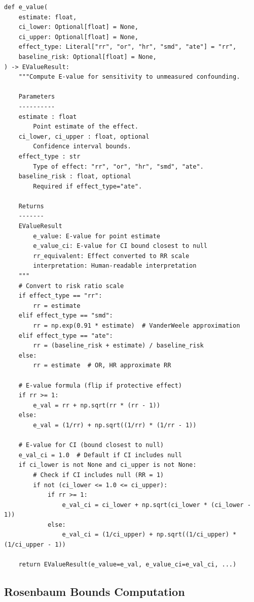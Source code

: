 \begin{verbatim}
def e_value(
    estimate: float,
    ci_lower: Optional[float] = None,
    ci_upper: Optional[float] = None,
    effect_type: Literal["rr", "or", "hr", "smd", "ate"] = "rr",
    baseline_risk: Optional[float] = None,
) -> EValueResult:
    """Compute E-value for sensitivity to unmeasured confounding.

    Parameters
    ----------
    estimate : float
        Point estimate of the effect.
    ci_lower, ci_upper : float, optional
        Confidence interval bounds.
    effect_type : str
        Type of effect: "rr", "or", "hr", "smd", "ate".
    baseline_risk : float, optional
        Required if effect_type="ate".

    Returns
    -------
    EValueResult
        e_value: E-value for point estimate
        e_value_ci: E-value for CI bound closest to null
        rr_equivalent: Effect converted to RR scale
        interpretation: Human-readable interpretation
    """
    # Convert to risk ratio scale
    if effect_type == "rr":
        rr = estimate
    elif effect_type == "smd":
        rr = np.exp(0.91 * estimate)  # VanderWeele approximation
    elif effect_type == "ate":
        rr = (baseline_risk + estimate) / baseline_risk
    else:
        rr = estimate  # OR, HR approximate RR

    # E-value formula (flip if protective effect)
    if rr >= 1:
        e_val = rr + np.sqrt(rr * (rr - 1))
    else:
        e_val = (1/rr) + np.sqrt((1/rr) * (1/rr - 1))

    # E-value for CI (bound closest to null)
    e_val_ci = 1.0  # Default if CI includes null
    if ci_lower is not None and ci_upper is not None:
        # Check if CI includes null (RR = 1)
        if not (ci_lower <= 1.0 <= ci_upper):
            if rr >= 1:
                e_val_ci = ci_lower + np.sqrt(ci_lower * (ci_lower - 1))
            else:
                e_val_ci = (1/ci_upper) + np.sqrt((1/ci_upper) * (1/ci_upper - 1))

    return EValueResult(e_value=e_val, e_value_ci=e_val_ci, ...)
\end{verbatim}

\subsection{Rosenbaum Bounds Computation}

